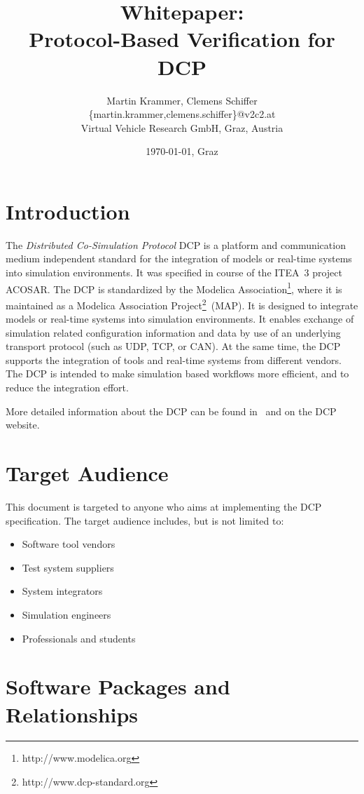 \documentclass[a4paper]{scrartcl}
\title{Whitepaper: \\Protocol-Based Verification for DCP}
\author{Martin Krammer, Clemens Schiffer\\\{martin.krammer,clemens.schiffer\}@v2c2.at\\
Virtual Vehicle Research GmbH, Graz, Austria}
\date{\today{}, Graz}
\theoremstyle{definition}
\begin{document}
\maketitle

\tableofcontents

\section{Introduction}
\label{sec:introduction}
The \textit{Distributed Co-Simulation Protocol} DCP is a platform and communication medium independent standard for the integration of models or real-time systems into simulation environments.
It was specified in course of the ITEA~3 project ACOSAR.
The DCP is standardized by the Modelica Association\footnote{http://www.modelica.org}, where it is maintained as a Modelica Association Project\footnote{http://www.dcp-standard.org}~(MAP).
It is designed to integrate models or real-time systems into simulation environments.
It enables exchange of simulation related configuration information and data by use of an underlying transport protocol (such as UDP, TCP, or CAN).
At the same time, the DCP supports the integration of tools and real-time systems from different vendors.
The DCP is intended to make simulation based workflows more efficient, and to reduce the integration effort.

More detailed information about the DCP can be found in~\cite{Krammer2018,Krammer2019} and on the DCP website.

\section{Target Audience}
\label{sec:audience}
This document is targeted to anyone who aims at implementing the DCP specification.
The target audience includes, but is not limited to:

\begin{itemize}
	\item Software tool vendors
	\item Test system suppliers
	\item System integrators
	\item Simulation engineers
	\item Professionals and students
\end{itemize}

\section{Software Packages and Relationships}
\label{sec:software}
\end{document}

